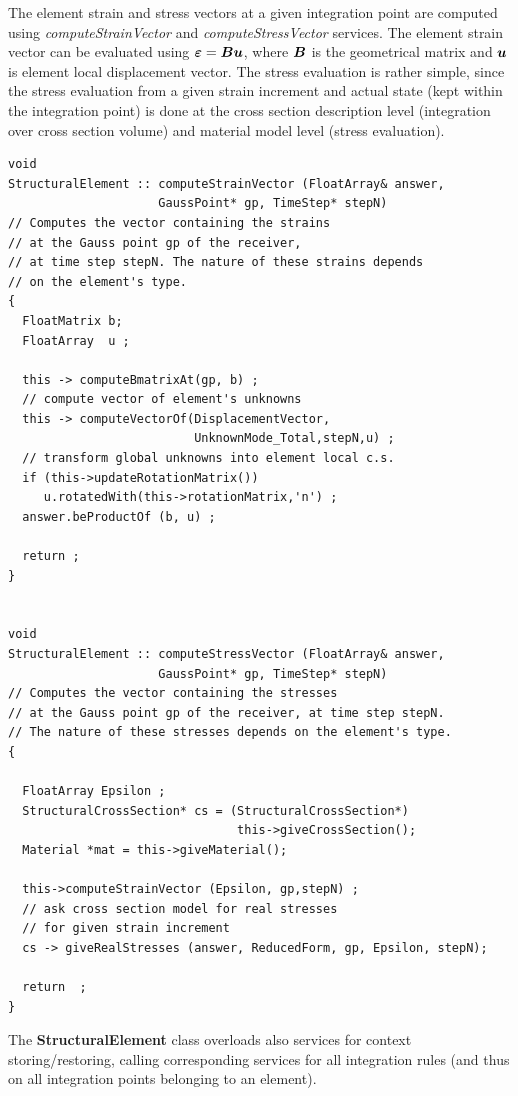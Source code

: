 \documentclass[a4paper]{article}
\newcommand{\class}[1]{{\bf #1}}
\newcommand{\service}[1]{{\em #1}}
\newcommand{\mbf}[1]{\mbox{\boldmath$#1$}}
\begin{document}
The element strain and stress vectors at a given integration point are
computed using \service{computeStrainVector} and
\service{computeStressVector} services. The element strain vector can
be evaluated using $\mbf{\varepsilon}=\mbf{B}\mbf{u}$, where $\mbf{B}$
is the geometrical matrix and $\mbf{u}$ is element local displacement
vector. The stress evaluation is rather simple, since the stress
evaluation from a given strain increment and actual state (kept within
the integration point) is done at the cross section description level
(integration over cross section volume) and material model level
(stress evaluation).
\begin{verbatim}
void
StructuralElement :: computeStrainVector (FloatArray& answer, 
                     GaussPoint* gp, TimeStep* stepN)
// Computes the vector containing the strains 
// at the Gauss point gp of the receiver, 
// at time step stepN. The nature of these strains depends
// on the element's type.
{
  FloatMatrix b;
  FloatArray  u ;
  
  this -> computeBmatrixAt(gp, b) ;
  // compute vector of element's unknowns
  this -> computeVectorOf(DisplacementVector,
                          UnknownMode_Total,stepN,u) ;
  // transform global unknowns into element local c.s.
  if (this->updateRotationMatrix()) 
     u.rotatedWith(this->rotationMatrix,'n') ;
  answer.beProductOf (b, u) ;
  
  return ;
}


void
StructuralElement :: computeStressVector (FloatArray& answer, 
                     GaussPoint* gp, TimeStep* stepN)
// Computes the vector containing the stresses 
// at the Gauss point gp of the receiver, at time step stepN. 
// The nature of these stresses depends on the element's type.
{

  FloatArray Epsilon ;
  StructuralCrossSection* cs = (StructuralCrossSection*) 
                                this->giveCrossSection();
  Material *mat = this->giveMaterial();
  
  this->computeStrainVector (Epsilon, gp,stepN) ;
  // ask cross section model for real stresses 
  // for given strain increment 
  cs -> giveRealStresses (answer, ReducedForm, gp, Epsilon, stepN);

  return  ;
}
\end{verbatim}

The \class{StructuralElement} class overloads also services for
context storing/restoring, calling corresponding services for all
integration rules (and thus on all integration points belonging to
an element). 
\end{document}
